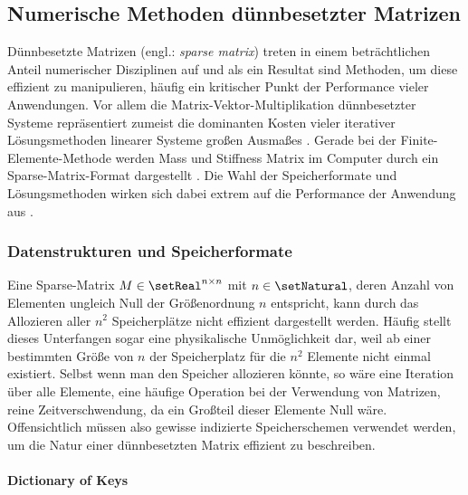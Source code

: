 \documentclass[crop=false]{standalone}
\begin{document}

    \subsection{Numerische Methoden dünnbesetzter Matrizen} %
    \label{sub:sparse_matrix_methoden}
      Dünnbesetzte Matrizen (engl.: \textit{sparse matrix}) treten in einem beträchtlichen Anteil numerischer Disziplinen auf und als ein Resultat sind Methoden, um diese effizient zu manipulieren, häufig ein kritischer Punkt der Performance vieler Anwendungen.
      Vor allem die Matrix-Vektor-Multiplikation dünnbesetzter Systeme repräsentiert zumeist die dominanten Kosten vieler iterativer Lösungsmethoden linearer Systeme großen Ausmaßes \cite{Bell2008}.
      Gerade bei der Finite-Elemente-Methode werden Mass und Stiffness Matrix im Computer durch ein Sparse-Matrix-Format dargestellt \cite{Bell2008,Logan2007,Alberty1998}.
      Die Wahl der Speicherformate und Lösungsmethoden wirken sich dabei extrem auf die Performance der Anwendung aus \cite{Bell2008,Bell2009}.

      \subsubsection{Datenstrukturen und Speicherformate} %
      \label{ssub:datenstrukturen_und_speicherformate}
        Eine Sparse-Matrix $M\in\setReal^{n\times n}$ mit $n\in\setNatural$, deren Anzahl von Elementen ungleich Null der Größenordnung $n$ entspricht, kann durch das Allozieren aller $n^2$ Speicherplätze nicht effizient dargestellt werden.
        Häufig stellt dieses Unterfangen sogar eine physikalische Unmöglichkeit dar, weil ab einer bestimmten Größe von $n$ der Speicherplatz für die $n^2$ Elemente nicht einmal existiert.
        Selbst wenn man den Speicher allozieren könnte, so wäre eine Iteration über alle Elemente, eine häufige Operation bei der Verwendung von Matrizen, reine Zeitverschwendung, da ein Großteil dieser Elemente Null wäre.
        Offensichtlich müssen also gewisse indizierte Speicherschemen verwendet werden, um die Natur einer dünnbesetzten Matrix effizient zu beschreiben.
        \cite[S.~78]{Press2002}

        \paragraph{Dictionary of Keys} %
        \label{par:dictionary_of_keys}
\end{document}
